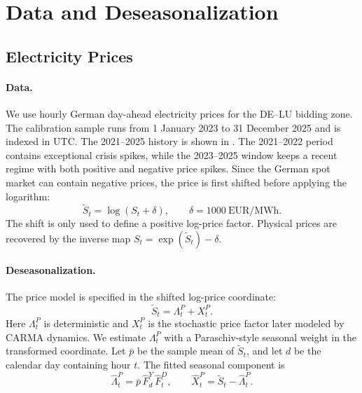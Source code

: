 \section{Data and Deseasonalization}\label{sec:deseasonalization}

\subsection{Electricity Prices}\label{ssec:price-deseasonalization}

\paragraph{Data.}
We use hourly German day-ahead electricity prices for the DE--LU bidding zone.
The calibration sample runs from 1 January 2023 to 31 December 2025 and is
indexed in UTC. The 2021--2025 history is shown in
. The 2021--2022 period contains exceptional
crisis spikes, while the 2023--2025 window keeps a recent regime with both
positive and negative price spikes. Since the German spot market can contain
negative prices, the price is first shifted before applying the logarithm:
\begin{equation}
  \widetilde S_t = \log(S_t + \delta),
  \qquad
  \delta = 1000 \ \text{EUR/MWh}.
  \label{eq:price-log-shift}
\end{equation}
The shift is only used to define a positive log-price factor. Physical prices
are recovered by the inverse map \(S_t = \exp(\widetilde S_t)-\delta\).

\paragraph{Deseasonalization.}
The price model is specified in the shifted log-price coordinate:
\begin{equation}
  \widetilde S_t = \Lambda^P_t + X^P_t .
  \label{eq:price-additive-decomposition}
\end{equation}
Here \(\Lambda^P_t\) is deterministic and \(X^P_t\) is the stochastic price
factor later modeled by CARMA dynamics. We estimate \(\Lambda^P_t\) with a
Paraschiv-style seasonal weight in the transformed coordinate. Let \(\bar p\)
be the sample mean of \(\widetilde S_t\), and let \(d\) be the calendar day
containing hour \(t\). The fitted seasonal component is
\begin{equation}
  \widehat\Lambda^P_t
  =
  \bar p\, \widehat F^{Y}_{d}\,\widehat F^{D}_{t},
  \qquad
  \widehat X^P_t = \widetilde S_t - \widehat\Lambda^P_t .
  \label{eq:price-seasonality}
\end{equation}

